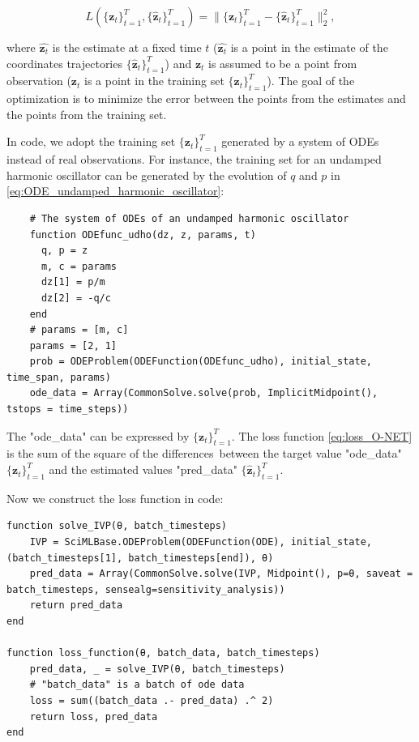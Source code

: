 \documentclass[
	parskip, 			   %
	twoside, 			   %
	DIV=14, 			   %
	BCOR=15.0mm, 		   %
	headsepline, 		   %
	open=right, 		   %
	captions=tableheading, %
	bibliography=totoc,    %
	numbers=noenddot       %
]{scrreprt}
\begin{document}
\begin{equation}
    \label{eq:loss_O-NET}
     L(\{ \mathbf{z}_{t} \}_{t=1}^{T}, \{ \mathbf{\hat{z}}_{t} \}_{t=1}^{T}) = \lVert \{ \mathbf{z}_{t} \}_{t=1}^{T} - \{ \mathbf{\hat{z}}_{t} \}_{t=1}^{T} \rVert_{2}^{2},
\end{equation}

where $\hat{\mathbf{z}_{t}}$ is the estimate at a fixed time $t$ ($\hat{\mathbf{z}_{t}}$ is a point in the estimate of the coordinates trajectories $\{ \mathbf{\hat{z}}_{t} \}_{t=1}^{T}$) and $\mathbf{z}_{t}$ is assumed to be a point from observation (${\mathbf{z}_{t}}$ is a point in the training set $\{ \mathbf{z}_{t} \}_{t=1}^{T}$). The goal of the optimization is to minimize the error between the points from the estimates and the points from the training set.

In code, we adopt the training set $\{ \mathbf{z}_{t} \}_{t=1}^{T}$ generated by a system of ODEs instead of real observations. For instance, the training set for an undamped harmonic oscillator can be generated by the evolution of $q$ and $p$ in \ref{eq:ODE_undamped_harmonic_oscillator}:

\begin{verbatim}
    # The system of ODEs of an undamped harmonic oscillator
    function ODEfunc_udho(dz, z, params, t)
      q, p = z
      m, c = params
      dz[1] = p/m
      dz[2] = -q/c
    end
    # params = [m, c]
    params = [2, 1] 
    prob = ODEProblem(ODEFunction(ODEfunc_udho), initial_state, time_span, params)
    ode_data = Array(CommonSolve.solve(prob, ImplicitMidpoint(), tstops = time_steps))
\end{verbatim}

The "ode\_data" can be expressed by $\{ \mathbf{z}_{t} \}_{t=1}^{T}$. The loss function \ref{eq:loss_O-NET} is the sum of the square of the differences between the target value "ode\_data" $\{ \mathbf{z}_{t} \}_{t=1}^{T}$ and the estimated values "pred\_data" $\{ \mathbf{\hat{z}}_{t} \}_{t=1}^{T}$.

Now we construct the loss function in code:
\begin{verbatim}
function solve_IVP(θ, batch_timesteps)
    IVP = SciMLBase.ODEProblem(ODEFunction(ODE), initial_state, (batch_timesteps[1], batch_timesteps[end]), θ)
    pred_data = Array(CommonSolve.solve(IVP, Midpoint(), p=θ, saveat = batch_timesteps, sensealg=sensitivity_analysis))
    return pred_data
end

function loss_function(θ, batch_data, batch_timesteps)
    pred_data, _ = solve_IVP(θ, batch_timesteps)
    # "batch_data" is a batch of ode data
    loss = sum((batch_data .- pred_data) .^ 2)
    return loss, pred_data
end
\end{verbatim}
\end{document}
